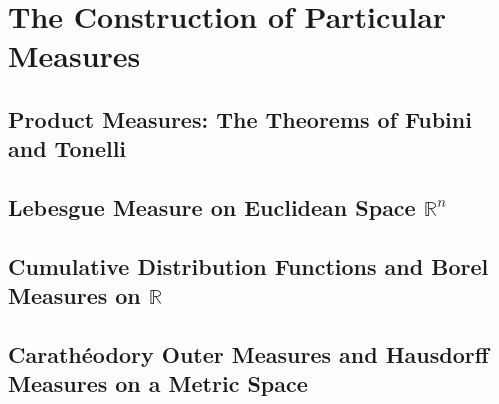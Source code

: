 \chapter{The Construction of Particular Measures}

\section{Product Measures: The Theorems of Fubini and Tonelli}
\section{Lebesgue Measure on Euclidean Space $\mathbb{R}^n$}
\section{Cumulative Distribution Functions and Borel Measures on $\mathbb{R}$}
\section{Carath\'eodory Outer Measures and Hausdorff Measures on a Metric Space}
